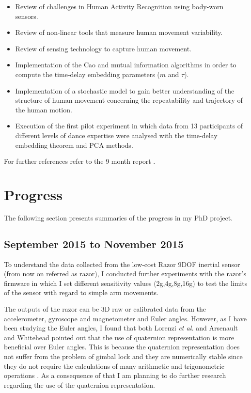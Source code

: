 \documentclass[9pt,journal,onecolumn,compsoc]{IEEEtran}
\begin{document}
\begin{itemize}
 \item Review of challenges in Human Activity Recognition using body-worn sensors.
 \item Review of non-linear tools that measure human movement variability.
 \item Review of sensing technology to capture human movement.
 \item Implementation of the Cao and mutual information algorithms in order
    to compute the time-delay embedding parameters ($m$ and $\tau$).
 \item Implementation of a stochastic model to gain better understanding of the
 structure of human movement concerning
 the repeatability and trajectory of the human motion.
 \item Execution of the first pilot experiment in which data from 13 participants of different
 levels of dance expertise were analysed with the time-delay embedding theorem and PCA methods.
\end{itemize}

For further references refer to the 9 month report \cite{mxochicale_9monthreport}.

\section{Progress}

The following section presents summaries of the progress in my PhD project.

\subsection{September 2015 to November 2015}

To understand the data collected from the low-cost Razor 9DOF inertial sensor
(from now on referred as razor),
I conducted further experiments with the razor's firmware in which I set
different sensitivity values (2g,4g,8g,16g) to test the limits of the sensor
with regard to simple arm movements.


The outputs of the razor can be 3D raw or calibrated data from the accelerometer,
gyroscope and magnetometer and Euler angles.
However, as I have been studying the Euler angles, I found that both Lorenzi \textit{et al.}
and Arsenault and Whitehead pointed out that the use of quaternion representation is more beneficial over Euler angles.
This is because the quaternion representation does not suffer from the problem of gimbal lock
and they are numerically stable since they do not require the calculations of
many arithmetic and trigonometric operations \cite{Lorenzi2015, Arsenault2015_a, Munkundan2002}.
As a consequence of that I am planning to do further research regarding the use of the quaternion representation.
\end{document}

